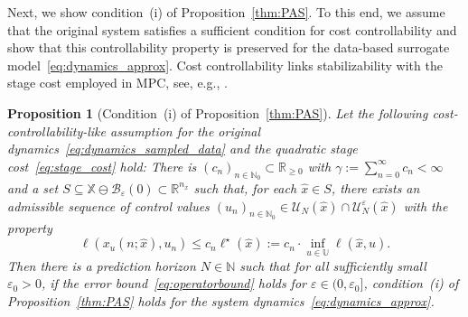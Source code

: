 \documentclass{article}
\numberwithin{equation}{section}
\newtheorem{proposition}[theorem]{Proposition}
\newcommand{\nx}{n_x}
\newcommand{\bU}{\mathbb U}
\begin{document}
	\noindent Next, we show condition~(i) of Proposition~\ref{thm:PAS}. To this end, we assume that the original system satisfies a sufficient condition for cost controllability and show that this controllability property is preserved for the data-based surrogate model~\eqref{eq:dynamics_approx}. Cost controllability links stabilizability with the stage cost employed in MPC, see, e.g., \cite{GrunPann10,Wort11}.
	\begin{proposition}[Condition~(i) of Proposition~\ref{thm:PAS}]\label{prop:as3}
		Let the following \emph{cost-controllability}-like assumption for the original dynamics~\eqref{eq:dynamics_sampled_data} and the quadratic stage cost~\eqref{eq:stage_cost} hold: 
		There is $(c_n)_{n \in \mathbb{N}_0} \subset \mathbb{R}_{\geq 0}$ with $\gamma := \sum_{n=0}^\infty c_n < \infty$ and a set $S \subseteq \mathbb{X} \ominus \mathcal{B}_\varepsilon(0) \subset \mathbb{R}^{\nx}$ such that, for each $\hat{x} \in S$, there exists an admissible sequence of control values $(u_n)_{n \in \mathbb{N}_0} \in \mathcal{U}_N(\hat{x}) \cap \mathcal{U}_N^\varepsilon(\hat{x})$ with the property
		\begin{equation}\label{eq:cost_controllability_cn}
		\ell(x_u(n;\hat{x}),u_n) \leq c_n \ell^\star(\hat{x}) := c_n \cdot \!\!\inf_{u \in \bU} \ell(\hat{x},u).
		\end{equation}
		Then there is a prediction horizon $N\in \mathbb{N}$ such that for all sufficiently small $\varepsilon_0 > 0$, if the error bound~\eqref{eq:operatorbound} holds for $\varepsilon \in (0,\varepsilon_0]$, condition~(i) of Proposition~\ref{thm:PAS} holds for the system dynamics~\eqref{eq:dynamics_approx}.
	\end{proposition}
\end{document}
